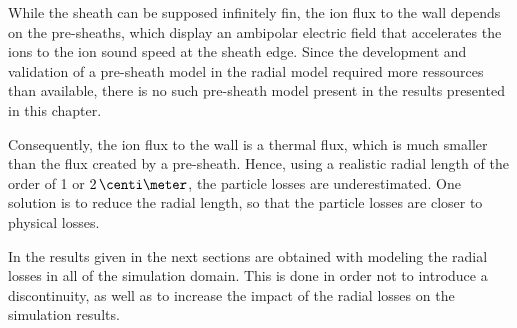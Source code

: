 \vspace{1ex}
While the sheath can be supposed infinitely fin, the ion flux to the wall depends on the pre-sheaths, which display an ambipolar electric field that accelerates the ions to the ion sound speed at the sheath edge.
Since the development and validation of a pre-sheath model in the radial model required more ressources than available, there is no such pre-sheath model present in the results presented in this chapter.

Consequently, the ion flux to the wall is a thermal flux, which is much smaller than the flux created by a pre-sheath.
Hence, using a realistic radial length  of the order of 1 or $2\,\centi\meter$, the particle losses are underestimated.
One solution is to reduce the radial length, so that the particle losses are closer to physical losses.

In the results given in the next sections are obtained with modeling the radial losses in all of the simulation domain.
This is done in order not to introduce a discontinuity, as well as to increase the impact of the radial losses on the simulation results.
